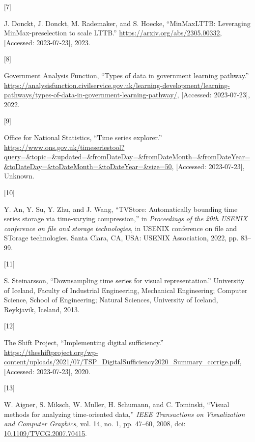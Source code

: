 \documentclass{article}
\newlength{\cslhangindent}
\newlength{\csllabelwidth}
\newlength{\cslentryspacingunit} %
\newenvironment{CSLReferences}[2] %
 {%
  \setlength{\parindent}{0pt}
  \ifodd #1
  \let\oldpar\par
  \def\par{\hangindent=\cslhangindent\oldpar}
  \fi
  \setlength{\parskip}{#2\cslentryspacingunit}
 }%
 {}
\newcommand{\CSLLeftMargin}[1]{\parbox[t]{\csllabelwidth}{#1}}
\newcommand{\CSLRightInline}[1]{\parbox[t]{\linewidth - \csllabelwidth}{#1}\break}
\begin{document}
\begin{CSLReferences}{0}{0}
\leavevmode{}%
\CSLLeftMargin{{[}7{]} }
\CSLRightInline{J. Donckt, J. Donckt, M. Rademaker, and S. Hoecke,
{``MinMaxLTTB: Leveraging MinMax-preselection to scale LTTB.''}
\url{https://arxiv.org/abs/2305.00332}, {[}Accessed: 2023-07-23{]},
2023.}

\leavevmode{}%
\CSLLeftMargin{{[}8{]} }
\CSLRightInline{Government Analysis Function, {``Types of data in
government learning pathway.''}
\url{https://analysisfunction.civilservice.gov.uk/learning-development/learning-pathways/types-of-data-in-government-learning-pathway/},
{[}Accessed: 2023-07-23{]}, 2022.}

\leavevmode{}%
\CSLLeftMargin{{[}9{]} }
\CSLRightInline{Office for National Statistics, {``Time series
explorer.''}
\url{https://www.ons.gov.uk/timeseriestool?query=\&topic=\&updated=\&fromDateDay=\&fromDateMonth=\&fromDateYear=\&toDateDay=\&toDateMonth=\&toDateYear=\&size=50},
{[}Accessed: 2023-07-23{]}, Unknown.}

\leavevmode{}%
\CSLLeftMargin{{[}10{]} }
\CSLRightInline{Y. An, Y. Su, Y. Zhu, and J. Wang, {``TVStore:
Automatically bounding time series storage via time-varying
compression,''} in \emph{Proceedings of the 20th USENIX conference on
file and storage technologies}, in USENIX conference on file and STorage
technologies. Santa Clara, CA, USA: USENIX Association, 2022, pp.
83--99.}

\leavevmode{}%
\CSLLeftMargin{{[}11{]} }
\CSLRightInline{S. Steinarsson, {``Downsampling time series for visual
representation.''} University of Iceland, Faculty of Industrial
Engineering, Mechanical Engineering; Computer Science, School of
Engineering; Natural Sciences, University of Iceland, Reykjavik,
Iceland, 2013.}

\leavevmode{}%
\CSLLeftMargin{{[}12{]} }
\CSLRightInline{The Shift Project, {``Implementing digital
sufficiency.''}
\url{https://theshiftproject.org/wp-content/uploads/2021/07/TSP_DigitalSufficiency2020_Summary_corrige.pdf},
{[}Accessed: 2023-07-23{]}, 2020.}

\leavevmode{}%
\CSLLeftMargin{{[}13{]} }
\CSLRightInline{W. Aigner, S. Miksch, W. Muller, H. Schumann, and C.
Tominski, {``Visual methods for analyzing time-oriented data,''}
\emph{IEEE Transactions on Visualization and Computer Graphics}, vol.
14, no. 1, pp. 47--60, 2008, doi:
\href{https://doi.org/10.1109/TVCG.2007.70415}{10.1109/TVCG.2007.70415}.}


\end{CSLReferences}
\end{document}

